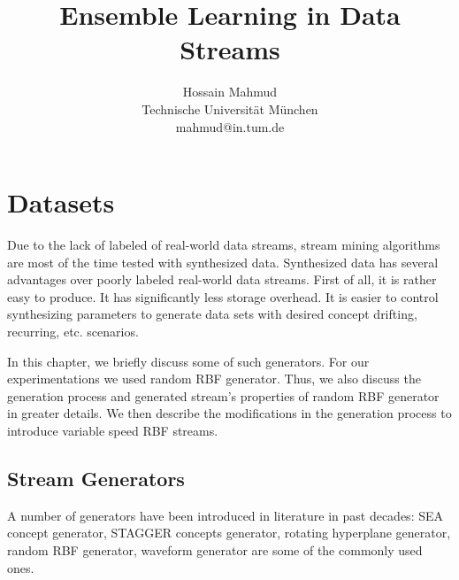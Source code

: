 \documentclass[a4paper, 11pt, oneside]{book}
\begin{document}
\title{Ensemble Learning in Data Streams}


\author{
Hossain Mahmud \\
Technische Universit\"at M\"unchen\\
mahmud@in.tum.de\\
}

\date{}

{}
\onehalfspacing
{}
\tableofcontents
\clearpage

\listoftables
{}
\clearpage

\listoffigures
{}
\clearpage

\listofalgorithms
{}
\clearpage

\onehalfspacing
{}
\setcounter{page}{1}






\chapter{Datasets}
Due to the lack of labeled of real-world data streams, stream mining algorithms are most of the time tested with synthesized data. Synthesized data has several advantages over poorly labeled real-world data streams. First of all, it is rather easy to produce. It has significantly less storage overhead. It is easier to control synthesizing parameters to generate data sets with desired concept drifting, recurring, etc. scenarios.

In this chapter, we briefly discuss some of such generators. For our experimentations we used random RBF generator. Thus, we also discuss the generation process and generated stream's properties of random RBF generator in greater details. We then describe the modifications in the generation process to introduce variable speed RBF streams.

\section{Stream Generators}
A number of generators have been introduced in literature in past decades: SEA concept generator, STAGGER concepts generator, rotating hyperplane generator, random RBF generator, waveform generator are some of the commonly used ones. 
\end{document}
